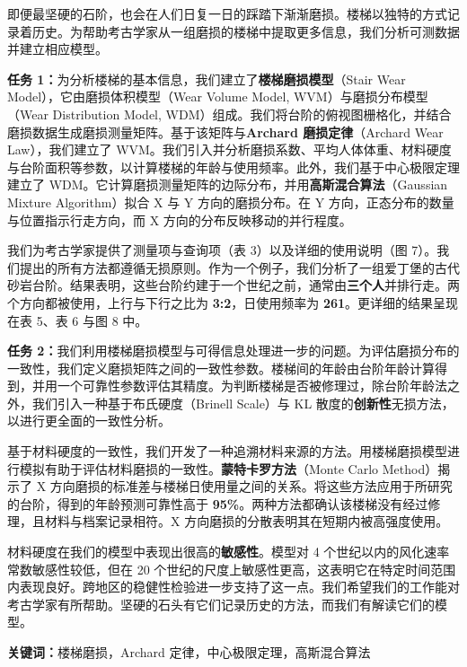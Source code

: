 \documentclass[11pt,a4paper]{ctexart}
\newcommand{\kw}[1]{\textbf{#1}}
\begin{document}
{\small
\noindent 即便最坚硬的石阶，也会在人们日复一日的踩踏下渐渐磨损。楼梯以独特的方式记录着历史。为帮助考古学家从一组磨损的楼梯中提取更多信息，我们分析可测数据并建立相应模型。

\noindent \kw{任务 1：}为分析楼梯的基本信息，我们建立了\kw{楼梯磨损模型}（Stair Wear Model），它由磨损体积模型（Wear Volume Model, WVM）与磨损分布模型（Wear Distribution Model, WDM）组成。我们将台阶的俯视图栅格化，并结合磨损数据生成磨损测量矩阵。基于该矩阵与\kw{Archard 磨损定律}（Archard Wear Law），我们建立了 WVM。我们引入并分析磨损系数、平均人体体重、材料硬度与台阶面积等参数，以计算楼梯的年龄与使用频率。此外，我们基于中心极限定理建立了 WDM。它计算磨损测量矩阵的边际分布，并用\kw{高斯混合算法}（Gaussian Mixture Algorithm）拟合 X 与 Y 方向的磨损分布。在 Y 方向，正态分布的数量与位置指示行走方向，而 X 方向的分布反映移动的并行程度。

\noindent 我们为考古学家提供了测量项与查询项（表 3）以及详细的使用说明（图 7）。我们提出的所有方法都遵循无损原则。作为一个例子，我们分析了一组爱丁堡的古代砂岩台阶。结果表明，这些台阶约建于一个世纪之前，通常由\kw{三个人}并排行走。两个方向都被使用，上行与下行之比为 \kw{3:2}，日使用频率为 \kw{261}。更详细的结果呈现在表 5、表 6 与图 8 中。

\noindent \kw{任务 2：}我们利用楼梯磨损模型与可得信息处理进一步的问题。为评估磨损分布的一致性，我们定义磨损矩阵之间的一致性参数。楼梯间的年龄由台阶年龄计算得到，并用一个可靠性参数评估其精度。为判断楼梯是否被修理过，除台阶年龄法之外，我们引入一种基于布氏硬度（Brinell Scale）与 KL 散度的\kw{创新性}无损方法，以进行更全面的一致性分析。

\noindent 基于材料硬度的一致性，我们开发了一种追溯材料来源的方法。用楼梯磨损模型进行模拟有助于评估材料磨损的一致性。\kw{蒙特卡罗方法}（Monte Carlo Method）揭示了 X 方向磨损的标准差与楼梯日使用量之间的关系。将这些方法应用于所研究的台阶，得到的年龄预测可靠性高于 \kw{95\%}。两种方法都确认该楼梯没有经过修理，且材料与档案记录相符。X 方向磨损的分散表明其在短期内被高强度使用。

\noindent 材料硬度在我们的模型中表现出很高的\kw{敏感性}。模型对 4 个世纪以内的风化速率常数敏感性较低，但在 20 个世纪的尺度上敏感性更高，这表明它在特定时间范围内表现良好。跨地区的稳健性检验进一步支持了这一点。我们希望我们的工作能对考古学家有所帮助。坚硬的石头有它们记录历史的方法，而我们有解读它们的模型。
}

\vspace{6pt}
\noindent\textbf{关键词：}楼梯磨损，Archard 定律，中心极限定理，高斯混合算法

\newpage
\pagestyle{fancy}
\end{document}
